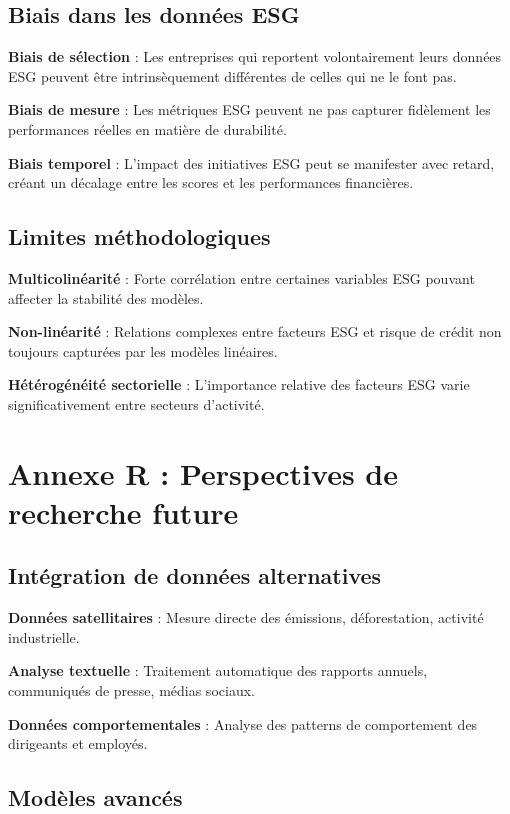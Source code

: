 \begin{table}[h]
\begin{table}[h]
\begin{table}[h]
\begin{table}[h]
\begin{table}[h]
\begin{table}[h]
\begin{table}[h]
\subsection{Biais dans les données ESG}

\textbf{Biais de sélection} : Les entreprises qui reportent volontairement leurs données ESG peuvent être intrinsèquement différentes de celles qui ne le font pas.

\textbf{Biais de mesure} : Les métriques ESG peuvent ne pas capturer fidèlement les performances réelles en matière de durabilité.

\textbf{Biais temporel} : L'impact des initiatives ESG peut se manifester avec retard, créant un décalage entre les scores et les performances financières.

\subsection{Limites méthodologiques}

\textbf{Multicolinéarité} : Forte corrélation entre certaines variables ESG pouvant affecter la stabilité des modèles.

\textbf{Non-linéarité} : Relations complexes entre facteurs ESG et risque de crédit non toujours capturées par les modèles linéaires.

\textbf{Hétérogénéité sectorielle} : L'importance relative des facteurs ESG varie significativement entre secteurs d'activité.

\section{Annexe R : Perspectives de recherche future}

\subsection{Intégration de données alternatives}

\textbf{Données satellitaires} : Mesure directe des émissions, déforestation, activité industrielle.

\textbf{Analyse textuelle} : Traitement automatique des rapports annuels, communiqués de presse, médias sociaux.

\textbf{Données comportementales} : Analyse des patterns de comportement des dirigeants et employés.

\subsection{Modèles avancés}


\end{table}
\end{table}
\end{table}
\end{table}
\end{table}
\end{table}
\end{table}
